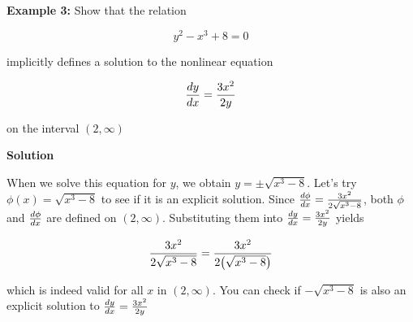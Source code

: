 \nopagenumbers
{\bf Example 3:} Show that the relation

$$y^2-x^3+8=0$$

implicitly defines a solution to the nonlinear equation

$${dy\over dx}={3x^2\over 2y}$$

on the interval $(2,\infty)$

\vskip 10pt
{\bf Solution}

\vskip 6pt
When we solve this equation for $y$, we obtain $y=\pm\sqrt{x^3-8}$. Let's try $\phi(x)=\sqrt{x^3-8}$ to see if it is an explicit solution. Since ${d\phi\over dx}={3x^2\over 2\sqrt{x^3-8}}$, both $\phi$ and ${d\phi\over dx}$ are defined on $(2,\infty)$. Substituting them into ${dy\over dx}={3x^2\over 2y}$ yields

$${3x^2\over 2\sqrt{x^3-8}}={3x^2\over 2\bigl(\sqrt{x^3-8}\bigr)}$$

which is indeed valid for all $x$ in $(2,\infty)$. You can check if $-\sqrt{x^3-8}$ is also an explicit solution to ${dy\over dx}={3x^2\over 2y}$

\vfill\eject
\bye
